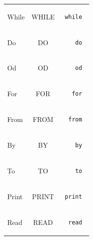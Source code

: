 \documentclass[pdftex,10pt,a4paper]{article}
\begin{document}
\begin{tabular}{|l|c|r|}
  While & WHILE & \begin{minipage}{2in} \begin{verbatim} while \end{verbatim} \end{minipage} \\
  Do & DO & \begin{minipage}{2in} \begin{verbatim} do \end{verbatim} \end{minipage} \\
  Od & OD & \begin{minipage}{2in} \begin{verbatim} od \end{verbatim} \end{minipage} \\
  For & FOR & \begin{minipage}{2in} \begin{verbatim} for \end{verbatim} \end{minipage} \\
  From & FROM & \begin{minipage}{2in} \begin{verbatim} from \end{verbatim} \end{minipage} \\
  By & BY & \begin{minipage}{2in} \begin{verbatim} by \end{verbatim} \end{minipage} \\
  To & TO & \begin{minipage}{2in} \begin{verbatim} to \end{verbatim} \end{minipage} \\

  Print & PRINT & \begin{minipage}{2in} \begin{verbatim} print \end{verbatim} \end{minipage} \\
  Read & READ & \begin{minipage}{2in} \begin{verbatim} read \end{verbatim} \end{minipage} \\


\end{tabular}
\end{document}
